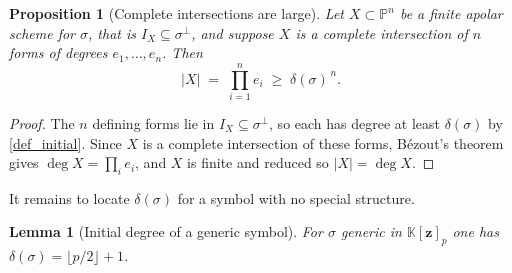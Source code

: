 \documentclass[final]{siamltex}
\newtheorem{lemma}[lemma]{Lemma}
\newtheorem{proposition}[proposition]{Proposition}
\newcommand{\K}{\mathbb{K}}
\newcommand{\bz}{\bm{z}}
\newcommand{\abs}[1]{\left|#1\right|}
\begin{document}
\begin{proposition}[Complete intersections are large]\label{prop_ci}
  Let $X \subset \mathbb{P}^{n}$ be a finite apolar scheme for $\sigma$, that is
  $I_{X} \subseteq \sigma^{\perp}$, and suppose $X$ is a complete intersection of
  $n$ forms of degrees $e_{1},\ldots,e_{n}$.  Then
  \begin{equation}\label{eq_ci}
    \abs{X} \;=\; \prod_{i=1}^{n} e_{i} \;\ge\; \delta(\sigma)^{\,n}.
  \end{equation}
\end{proposition}

\begin{proof}
  The $n$ defining forms lie in $I_{X} \subseteq \sigma^{\perp}$, so each has
  degree at least $\delta(\sigma)$ by \cref{def_initial}.  Since $X$ is a
  complete intersection of these forms, B\'ezout's theorem gives
  $\deg X = \prod_{i} e_{i}$, and $X$ is finite and reduced so
  $\abs{X} = \deg X$.
\end{proof}

It remains to locate $\delta(\sigma)$ for a symbol with no special structure.

\begin{lemma}[Initial degree of a generic symbol]\label{lem_generic_delta}
  For $\sigma$ generic in $\K[\bz]_{p}$ one has
  $\delta(\sigma) = \lfloor p/2 \rfloor + 1$.
\end{lemma}
\end{document}
